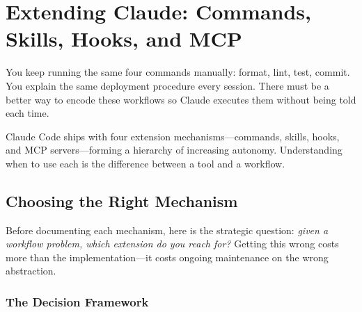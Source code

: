 \chapter{Extending Claude: Commands, Skills, Hooks, and MCP}
\label{ch:extending}

\begin{itshape}
You keep running the same four commands manually: format, lint, test, commit.
You explain the same deployment procedure every session.
There must be a better way to encode these workflows so Claude executes them
without being told each time.
\end{itshape}

Claude Code ships with four extension mechanisms---commands, skills, hooks,
and MCP servers---forming a hierarchy of increasing autonomy.
Understanding when to use each is the difference between a tool and a workflow.

\section{Choosing the Right Mechanism}
\label{sec:extension-strategy}


Before documenting each mechanism, here is the strategic question:
\emph{given a workflow problem, which extension do you reach for?}
Getting this wrong costs more than the implementation---it costs
ongoing maintenance on the wrong abstraction.

\subsection*{The Decision Framework}

